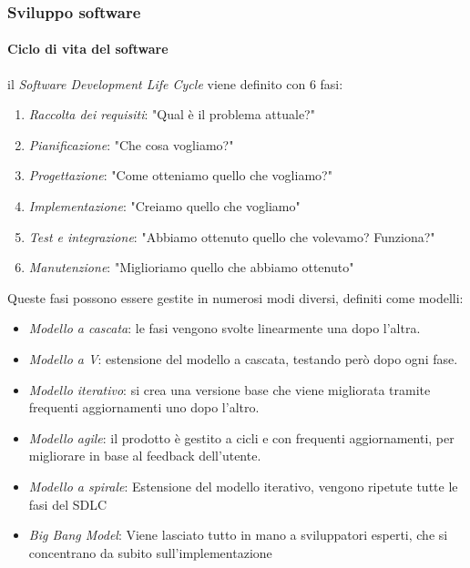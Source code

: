 \documentclass{article}
\begin{document}
        \subsubsection{Sviluppo software}
            \paragraph{Ciclo di vita del software} il \textit{Software Development Life Cycle} viene definito con 6 fasi:
                \begin{enumerate}
                    \item \textit{Raccolta dei requisiti}: "Qual è il problema attuale?"
                    \item \textit{Pianificazione}: "Che cosa vogliamo?"
                    \item \textit{Progettazione}: "Come otteniamo quello che vogliamo?"
                    \item \textit{Implementazione}: "Creiamo quello che vogliamo"
                    \item \textit{Test e integrazione}: "Abbiamo ottenuto quello che volevamo? Funziona?"
                    \item \textit{Manutenzione}: "Miglioriamo quello che abbiamo ottenuto"
                \end{enumerate}
                Queste fasi possono essere gestite in numerosi modi diversi, definiti come modelli:
                \begin{itemize}
                    \item \textit{Modello a cascata}: le fasi vengono svolte linearmente una dopo l'altra.
                    \item \textit{Modello a V}: estensione del modello a cascata, testando però dopo ogni fase.
                    \item \textit{Modello iterativo}: si crea una versione base che viene migliorata tramite frequenti aggiornamenti uno dopo l'altro.
                    \item \textit{Modello agile}: il prodotto è gestito a cicli e con frequenti aggiornamenti, per  migliorare in base al feedback dell'utente.
                    \item \textit{Modello a spirale}: Estensione del modello iterativo, vengono ripetute tutte le fasi del SDLC
                    \item \textit{Big Bang Model}: Viene lasciato tutto in mano a sviluppatori esperti, che si concentrano da subito sull'implementazione
                \end{itemize}
\end{document}
